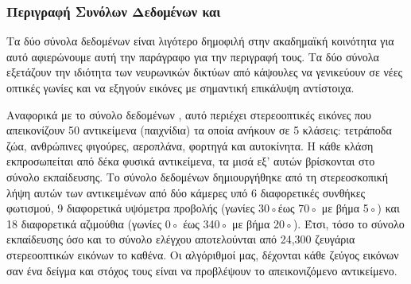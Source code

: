 \begin{table}[h]
    \begin{center}
        \end{center}
        \caption{\label{tab:exp_datasets} Πίνακας που συγκεντρώνει το καλύτερο μοντέλο και την απόδοσή του, για κάθε σύνολο δεδομένων.}
    \end{table}
    \subsubsection{Περιγραφή Συνόλων Δεδομένων  και }
    Τα δύο σύνολα δεδομένων είναι λιγότερο δημοφιλή στην ακαδημαϊκή κοινότητα για αυτό αφιερώνουμε αυτή την παράγραφο για την περιγραφή τους. Τα δύο  σύνολα εξετάζουν την ιδιότητα των νευρωνικών δικτύων από κάψουλες να γενικεύουν σε νέες οπτικές γωνίες και να εξηγούν εικόνες με σημαντική επικάλυψη αντίστοιχα.\par

    Αναφορικά με το σύνολο δεδομένων , αυτό περιέχει στερεο\textendash οπτικές εικόνες που απεικονίζουν 50 αντικείμενα (παιχνίδια) τα οποία ανήκουν σε 5 κλάσεις: τετράποδα ζώα, ανθρώπινες φιγούρες, αεροπλάνα, φορτηγά και αυτοκίνητα. Η κάθε κλάση εκπροσωπείται από δέκα φυσικά αντικείμενα, τα μισά εξ' αυτών βρίσκονται στο σύνολο εκπαίδευσης. Το σύνολο δεδομένων δημιουργήθηκε από τη στερεοσκοπική λήψη αυτών των αντικειμένων από δύο κάμερες υπό 6 διαφορετικές συνθήκες φωτισμού, 9 διαφορετικά υψόμετρα προβολής (γωνίες 30◦έως 70◦ με βήμα 5◦) και 18 διαφορετικά αζιμούθια (γωνίες 0◦ έως 340◦ με βήμα 20◦). Έτσι, τόσο το σύνολο εκπαίδευσης όσο και το σύνολο ελέγχου αποτελούνται από 24,300 ζευγάρια στερεο\textendash οπτικών εικόνων το καθένα. Οι αλγόριθμοί μας, δέχονται κάθε ζεύγος εικόνων σαν ένα δείγμα και στόχος τους είναι να προβλέψουν το απεικονιζόμενο αντικείμενο.\par


